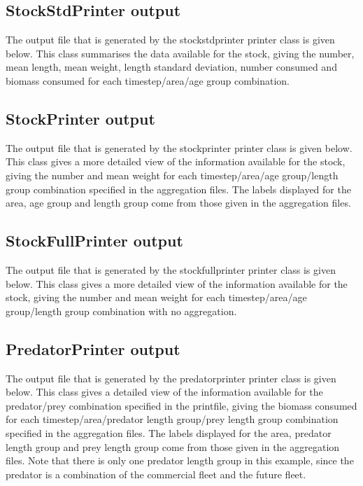 \documentclass[10pt,titlepage]{article}
\begin{document}
\subsection{StockStdPrinter output}

The output file that is generated by the stockstdprinter printer class is given below.  This class summarises the data available for the stock, giving the number, mean length, mean weight, length standard deviation, number consumed and biomass consumed for each timestep/area/age group combination.

{\small }

\subsection{StockPrinter output}

The output file that is generated by the stockprinter printer class is given below.  This class gives a more detailed view of the information available for the stock, giving the number and mean weight for each timestep/area/age group/length group combination specified in the aggregation files.  The labels displayed for the area, age group and length group come from those given in the aggregation files.

{\small }

\subsection{StockFullPrinter output}

The output file that is generated by the stockfullprinter printer class is given below.  This class gives a more detailed view of the information available for the stock, giving the number and mean weight for each timestep/area/age group/length group combination with no aggregation.

{\small }

\subsection{PredatorPrinter output}

The output file that is generated by the predatorprinter printer class is given below.  This class gives a detailed view of the information available for the predator/prey combination specified in the printfile, giving the biomass consumed for each timestep/area/predator length group/prey length group combination specified in the aggregation files.  The labels displayed for the area, predator length group and prey length group come from those given in the aggregation files.  Note that there is only one predator length group in this example, since the predator is a combination of the commercial fleet and the future fleet.
\end{document}

